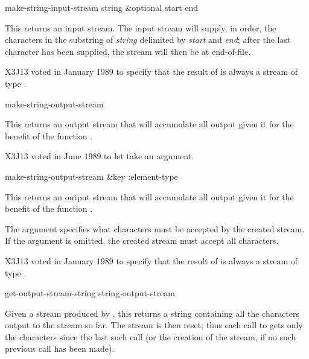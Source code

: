 \begin{defun}[Function]
make-string-input-stream string &optional start end

This returns an input stream.
The input stream will supply, in order, the characters in the substring
of \emph{string} delimited by \emph{start} and \emph{end}; after the last
character has been supplied, the stream will then be at end-of-file.

\begin{new}
X3J13 voted in January 1989
to specify that the result of
 is always a stream of type .
\end{new}
\end{defun}

\begin{obsolete}
\begin{defun}[Function]
make-string-output-stream 

This returns an output stream that will 
accumulate all output given it for the benefit of the function
.
\end{defun}
\end{obsolete}

\begin{newer}
X3J13 voted in June 1989 
to let  take an  argument.

\begin{defun}[Function]
make-string-output-stream &key :element-type

This returns an output stream that will 
accumulate all output given it for the benefit of the function
.

The  argument specifies what characters
must be accepted by the created stream.  If the  argument
is omitted, the created stream must accept all characters.

X3J13 voted in January 1989
to specify that the result of
 is always a stream of type .
\end{defun}
\end{newer}


\begin{defun}[Function]
get-output-stream-string string-output-stream

Given a stream produced by , this
returns a string containing all the characters output to the stream so far.
The stream is then reset; thus each call to 
gets only the characters since the last such call (or the creation
of the stream, if no such previous call has been made).
\end{defun}

